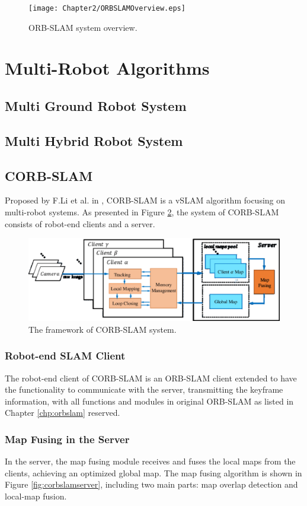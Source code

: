 \begin{figure}[H]
\centering
\texttt{[image: Chapter2/ORBSLAMOverview.eps]}
\caption{ORB-SLAM system overview.}
\label{fig:orbslamoverview} 
\end{figure}

\section{Multi-Robot Algorithms}
\subsection{Multi Ground Robot System}
\subsection{Multi Hybrid Robot System}
\subsection{CORB-SLAM}
Proposed by F.Li et al. in \cite{li2017corb}, CORB-SLAM is a vSLAM algorithm focusing on  multi-robot systems. As presented in Figure \ref{fig:corbslamoverview}, the system of CORB-SLAM consists of robot-end clients and a server.
\begin{figure}[H]
\centering
\includegraphics[width=5in]{Chapter2/CORBSLAMOverview.eps}
\caption{The framework of CORB-SLAM system.}
\label{fig:corbslamoverview} 
\end{figure}

\subsubsection{Robot-end SLAM Client}
The robot-end client of CORB-SLAM is an ORB-SLAM client extended to have the functionality to communicate with the server, transmitting the keyframe information, with all functions and modules in original ORB-SLAM as listed in Chapter \ref{chp:orbslam} reserved.

\subsubsection{Map Fusing in the Server}
In the server, the map fusing module receives and fuses the local maps from the clients, achieving an optimized global map. The map fusing algorithm is shown in Figure \ref{fig:corbslamserver}, including two main parts: map overlap detection and local-map fusion.

